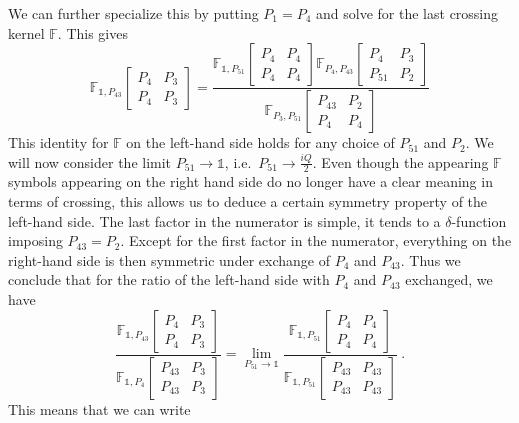 \documentclass[12pt,a4paper]{article}
\newcommand{\be}{\begin{equation}}
\newcommand{\ee}{\end{equation}}
\newcommand\id{\mathds{1}}
\begin{document}
We can further specialize this by putting $P_1=P_4$ and solve for the last crossing kernel $\mathbb{F}$. This gives
\be 
\mathbb{F}_{\id,P_{43}}\!\begin{bmatrix}
    P_4 & P_3 \\
    P_4 & P_3
\end{bmatrix}=\frac{\mathbb{F}_{\id,P_{51}}\!\begin{bmatrix}
    P_4 & P_4 \\P_4 & P_4
\end{bmatrix} 
\mathbb{F}_{P_4,P_{43}}\!\begin{bmatrix}
    P_4 & P_3 \\P_{51} & P_2
\end{bmatrix}}{\mathbb{F}_{P_3,P_{51}}\!\begin{bmatrix}
    P_{43} & P_2 \\ P_4 & P_4
\end{bmatrix}}
\ee
This identity for $\mathbb{F}$ on the left-hand side holds for any choice of $P_{51}$ and $P_2$. We will now consider the limit $P_{51} \to \id$, i.e.\ $P_{51} \to \frac{iQ}{2}$. Even though the appearing $\mathbb{F}$ symbols appearing on the right hand side do no longer have a clear meaning in terms of crossing, this allows us to deduce a certain symmetry property of the left-hand side. The last factor in the numerator is simple, it tends to a $\delta$-function imposing $P_{43}=P_2$. Except for the first factor in the numerator, everything on the right-hand side is then symmetric under exchange of $P_4$ and $P_{43}$. Thus we conclude that for the ratio of the left-hand side with $P_4$ and $P_{43}$ exchanged, we have
\be 
\frac{\mathbb{F}_{\id,P_{43}}\!\begin{bmatrix}
    P_4 & P_3 \\
    P_4 & P_3
\end{bmatrix}}{\mathbb{F}_{\id,P_{4}}\!\begin{bmatrix}
    P_{43} & P_3 \\
    P_{43} & P_3
\end{bmatrix}}=\lim_{P_{51} \to \id } \frac{\mathbb{F}_{\id,P_{51}}\!\begin{bmatrix}
    P_4 & P_4 \\P_4 & P_4
\end{bmatrix} }{\mathbb{F}_{\id,P_{51}}\!\begin{bmatrix}
    P_{43} & P_{43} \\P_{43} & P_{43}
\end{bmatrix} } \ . \label{eq:ratio F exchange rho0}
\ee
This means that we can write
\end{document}
